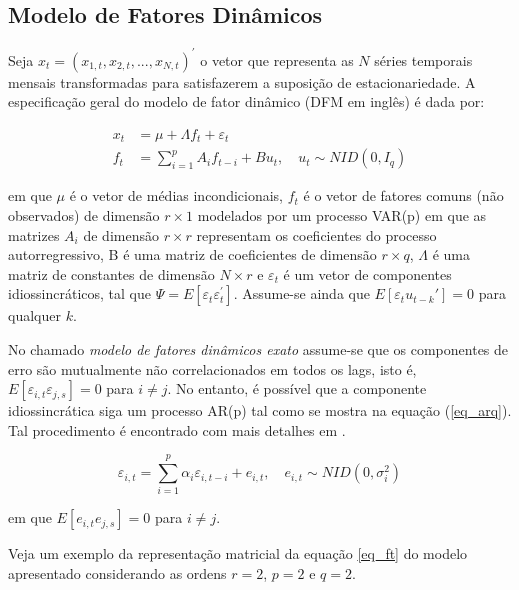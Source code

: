 \documentclass{article}
\begin{document}
\subsection{Modelo de Fatores Dinâmicos}\label{DFMmodel}

Seja $x_t = (x_{1,t},x_{2,t}, ..., x_{N,t})^{'}$ o vetor que representa as $N$ séries temporais mensais transformadas para satisfazerem a suposição de estacionariedade. A especificação geral do modelo de fator dinâmico (DFM em inglês) é dada por:

\begin{align}
x_t   &= \mu + \Lambda f_t + \varepsilon_t \label{eq_xt} \\
f_{t} &= \sum_{i=1}^{p} A_i f_{t-i} + B u_t, \quad u_t \sim NID(0,I_q) \label{eq_ft}
\end{align}

em que $\mu$ é o vetor de médias incondicionais, $f_t$ é o vetor de fatores comuns (não observados) de dimensão $r \times 1$ modelados por um processo VAR(p) em que as matrizes $A_i$ de dimensão $r \times r$ representam os coeficientes do processo autorregressivo, B é uma matriz de coeficientes de dimensão $r \times q$, $\Lambda$ é uma matriz de constantes de dimensão $N \times r$ e $\varepsilon_t$ é um vetor de componentes idiossincráticos, tal que $\Psi = E[\varepsilon_{t} \varepsilon^{'}_{t}]$. Assume-se ainda que $E[\varepsilon_t u_{t-k}'] = 0$ para qualquer $k$. %

No chamado \textit{modelo de fatores dinâmicos exato} assume-se que os componentes de erro são mutualmente não correlacionados em todos os lags, isto é, $E[\varepsilon_{i,t} \varepsilon_{j,s}] = 0$ para $i \neq j$. No entanto, é possível que a componente idiossincrática siga um processo AR(p) tal como se mostra na equação (\ref{eq_arq}). Tal procedimento é encontrado com mais detalhes em \cite{banburaetal2011}.

\begin{equation}\label{eq_arq}
\varepsilon_{i,t} = \sum_{i=1}^{p} \alpha_i \varepsilon_{i,t-i} + e_{i,t}, \quad e_{i,t} \sim NID(0,\sigma^2_i)
\end{equation}

em que $E[e_{i,t} e_{j,s}] = 0$ para $i \neq j$.



Veja um exemplo da representação matricial da equação \ref{eq_ft} do modelo apresentado considerando as ordens $r = 2$, $p = 2$ e $q = 2$.
\end{document}
